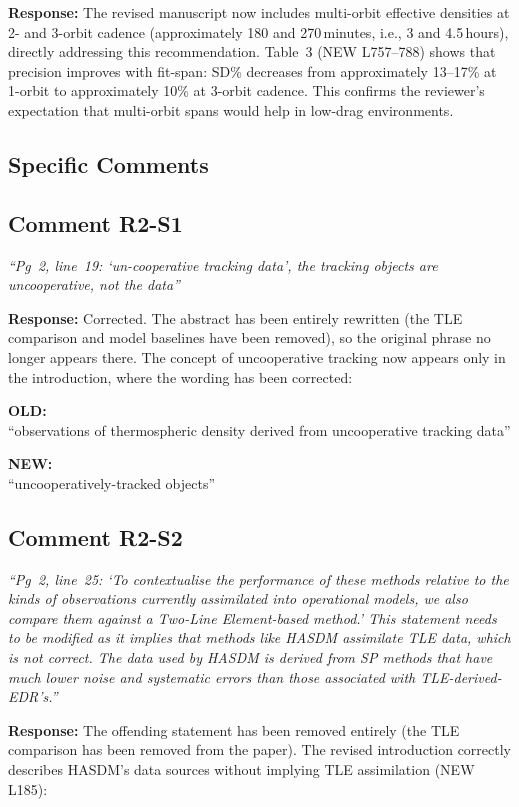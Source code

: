 \documentclass[11pt]{article}
\newcommand{\reviewercomment}[1]{%
  \medskip
  \noindent\textit{\color{reviewblue}#1}%
  \medskip
}
\newcommand{\oldtext}[1]{%
  \smallskip
  \noindent\hspace{1em}\begin{minipage}{0.92\textwidth}%
  \color{quotegray}\textbf{OLD:}\\[2pt]``#1''%
  \end{minipage}%
  \smallskip
}
\newcommand{\newtext}[1]{%
  \smallskip
  \noindent\hspace{1em}\begin{minipage}{0.92\textwidth}%
  \color{quotegreen}\textbf{NEW:}\\[2pt]``#1''%
  \end{minipage}%
  \smallskip
}
\begin{document}
\textbf{Response:}
The revised manuscript now includes multi-orbit effective densities at 2- and 3-orbit cadence (approximately 180 and 270\,minutes, i.e., 3 and 4.5\,hours), directly addressing this recommendation. Table~3 (NEW L757--788) shows that precision improves with fit-span: SD\% decreases from approximately 13--17\% at 1-orbit to approximately 10\% at 3-orbit cadence. This confirms the reviewer's expectation that multi-orbit spans would help in low-drag environments.


\subsection*{Specific Comments}

\subsection{Comment R2-S1}

\reviewercomment{%
``Pg~2, line~19: `un-cooperative tracking data', the tracking objects are uncooperative, not the data''}

\textbf{Response:}
Corrected. The abstract has been entirely rewritten (the TLE comparison and model baselines have been removed), so the original phrase no longer appears there. The concept of uncooperative tracking now appears only in the introduction, where the wording has been corrected:

\oldtext{observations of thermospheric density derived from uncooperative tracking data}

\newtext{uncooperatively-tracked objects}


\subsection{Comment R2-S2}

\reviewercomment{%
``Pg~2, line~25: `To contextualise the performance of these methods relative to the kinds of observations currently assimilated into operational models, we also compare them against a Two-Line Element-based method.' This statement needs to be modified as it implies that methods like HASDM assimilate TLE data, which is not correct. The data used by HASDM is derived from SP methods that have much lower noise and systematic errors than those associated with TLE-derived-EDR's.''}

\textbf{Response:}
The offending statement has been removed entirely (the TLE comparison has been removed from the paper). The revised introduction correctly describes HASDM's data sources without implying TLE assimilation (NEW L185):
\end{document}
